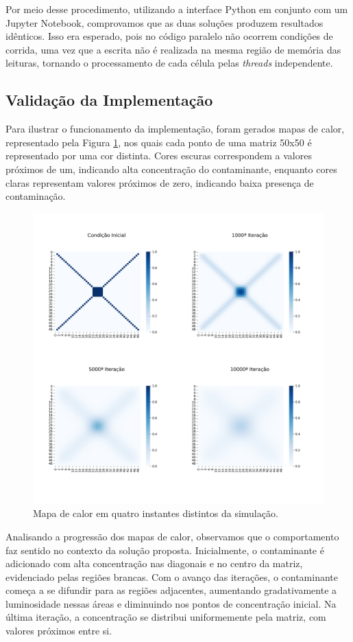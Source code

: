 \documentclass[12pt]{article}
\begin{document}
Por meio desse procedimento, utilizando a interface Python em conjunto com um Jupyter Notebook, comprovamos que as duas soluções produzem resultados idênticos. Isso era esperado, pois no código paralelo não ocorrem condições de corrida, uma vez que a escrita não é realizada na mesma região de memória das leituras, tornando o processamento de cada célula pelas \textit{threads} independente.

\subsection{Validação da Implementação}

Para ilustrar o funcionamento da implementação, foram gerados mapas de calor, representado pela Figura \ref{fig:heatmap}, nos quais cada ponto de uma matriz 50x50 é representado por uma cor distinta. Cores escuras correspondem a valores próximos de um, indicando alta concentração do contaminante, enquanto cores claras representam valores próximos de zero, indicando baixa presença de contaminação.

\begin{figure}[ht]
\centering
\includegraphics[width=.7\textwidth]{figs/heatmap.png}
\caption{Mapa de calor em quatro instantes distintos da simulação.}
\label{fig:heatmap}
\end{figure}

Analisando a progressão dos mapas de calor, observamos que o comportamento faz sentido no contexto da solução proposta. Inicialmente, o contaminante é adicionado com alta concentração nas diagonais e no centro da matriz, evidenciado pelas regiões brancas. Com o avanço das iterações, o contaminante começa a se difundir para as regiões adjacentes, aumentando gradativamente a luminosidade nessas áreas e diminuindo nos pontos de concentração inicial. Na última iteração, a concentração se distribui uniformemente pela matriz, com valores próximos entre si.
\end{document}
